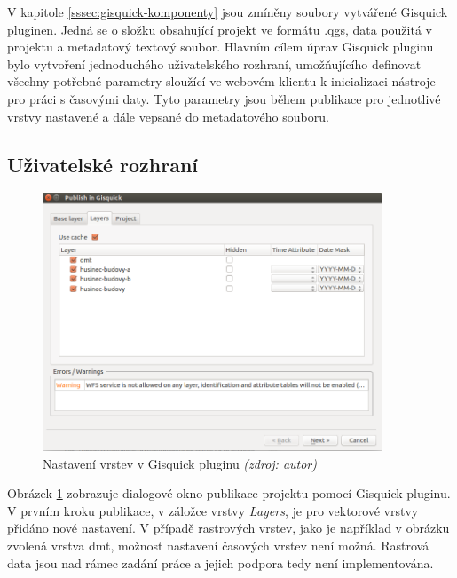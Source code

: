 V kapitole \ref{sssec:gisquick-komponenty} jsou zmíněny soubory vytvářené
Gisquick pluginen. 
Jedná se o složku obsahující projekt ve formátu .qgs, data
použitá v projektu a metadatový textový soubor. Hlavním cílem úprav
Gisquick pluginu bylo vytvoření jednoduchého uživatelského rozhraní,
umožňujícího definovat všechny potřebné parametry sloužící ve
webovém klientu k inicializaci nástroje pro práci s časovými daty. Tyto
parametry jsou během publikace pro jednotlivé vrstvy nastavené a dále
vepsané do metadatového souboru.

\subsection{Uživatelské rozhraní}
\label{sssec:plugin-ui}

\begin{figure}[h!]
\centering
\includegraphics[width=0.9\textwidth]{./img/gisquick-plugin.png}
\caption{Nastavení vrstev v Gisquick pluginu \textit{(zdroj: autor)}}
\label{fig:gisquick-plugin-layers}
\end{figure}

Obrázek \ref{fig:gisquick-plugin-layers} zobrazuje dialogové okno publikace
projektu pomocí Gisquick pluginu. V prvním kroku publikace, v záložce
vrstvy \textit{Layers}, je pro vektorové vrstvy přidáno nové nastavení. V
případě rastrových vrstev, jako je například v obrázku zvolená vrstva dmt,
možnost nastavení časových vrstev není možná. Rastrová data jsou nad rámec 
zadání práce a jejich podpora tedy není implementována.

